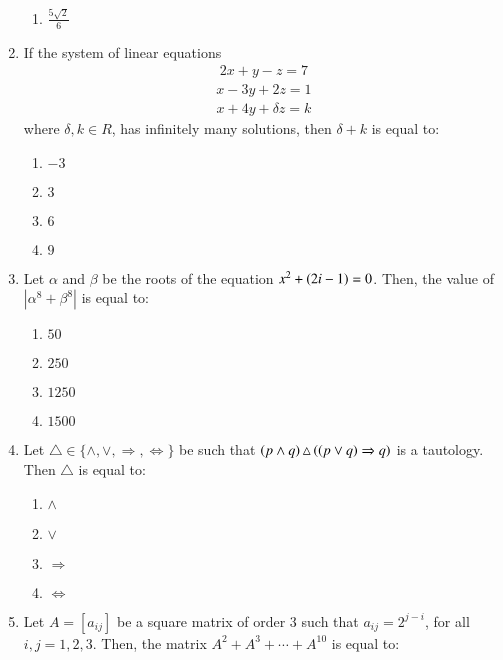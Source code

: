 \documentclass[journal,12pt,twocolumn]{IEEEtran}
\theoremstyle{remark}
\begin{document}
\begin{enumerate}
\begin{multicols}{2}
\begin{enumerate}
    \item $\frac{5\sqrt{2}}{6}$ 
\end{enumerate}
\end{multicols}
\bigskip
\item If the system of linear equations 
\begin{align*}
    2x+y-z=7
\end{align*}
\begin{align*}
    x-3y+2z=1
\end{align*}
\begin{align*}
    x+4y+\delta z=k
\end{align*}
where $\delta,k \in R$, has infinitely many solutions, then $\delta+k$ is equal to:
\begin{multicols}{2}
\begin{enumerate}
    \item $-3$
    \item $3$
    \item $6$
    \item $9$
\end{enumerate}
\end{multicols}
\bigskip
\item Let $\alpha$ and $\beta$ be the roots of the equation $x^2+\left(2i-1\right)=0$. Then, the value of $|\alpha^8+\beta^8|$ is equal to:
\begin{multicols}{2}
\begin{enumerate}
       \item $50$
       \item $250$
       \item $1250$
       \item $1500$
\end{enumerate}
\end{multicols}
\bigskip
\item Let $\triangle \in \{\wedge, \vee, \Rightarrow, \Leftrightarrow\}$ be such that $\left(p \wedge q\right)\triangle\left(\left(p\vee q\right)\Rightarrow q\right)$ is a tautology. Then $\triangle$ is equal to:
\begin{multicols}{2}
\begin{enumerate}
    \item $\wedge$
    \item $\vee$
    \item $\Rightarrow$
    \item $\Leftrightarrow$
\end{enumerate}
\end{multicols}
\bigskip
\item Let $A=[a_{ij}]$ be a square matrix of order 3 such that $a_{ij}=2^{j-i}$, for all $i,j=1,2,3$. Then, the matrix $A^2+A^3+\cdots+A^{10}$ is equal to:

\end{enumerate}
\end{document}
